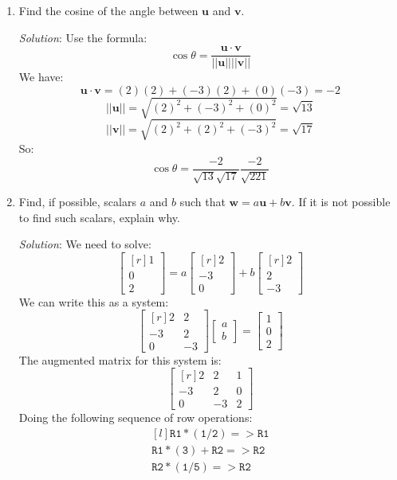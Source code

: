 \documentclass[12pt]{article}
\begin{document}
\begin{enumerate}
\item Find the cosine of the angle between $\mathbf{u}$ and $\mathbf{v}$.

\emph{Solution}: Use the formula:
\[
\cos\theta = \frac{\mathbf{u}\cdot\mathbf{v}}{||\mathbf{u}||||\mathbf{v}||}
\]
We have:
\[
\mathbf{u}\cdot\mathbf{v}=(2)(2)+(-3)(2)+(0)(-3)=-2
\]
\[
||\mathbf{u}||=\sqrt{(2)^2+(-3)^2+(0)^2}=\sqrt{13}
\]
\[
||\mathbf{v}||=\sqrt{(2)^2+(2)^2+(-3)^2}=\sqrt{17}
\]
So:
\[
\cos\theta =\frac{-2}{\sqrt{13}\sqrt{17}}\frac{-2}{\sqrt{221}}
\]
\proofend

\item Find, if possible, scalars $a$ and $b$ such that $\mathbf{w}=a\mathbf{u}+b\mathbf{v}$. If it is not possible to find such scalars, explain why.

\emph{Solution}:
We need to solve:
\[
\begin{bmatrix*}[r] 1\\ 0\\  2\end{bmatrix*}=
a\begin{bmatrix*}[r] 2\\ -3\\ 0\end{bmatrix*}+
b\begin{bmatrix*}[r] 2\\ 2\\ -3\end{bmatrix*}
\]
We can write this as a system:
\[
\begin{bmatrix*}[r] 2&2\\-3&2\\0&-3\end{bmatrix*}
\begin{bmatrix}a\\b\end{bmatrix}=
\begin{bmatrix*}1\\0\\2\end{bmatrix*}
\]
The augmented matrix for this system is:
\[
\left[\begin{matrix*}[r]2 & 2 & 1\\-3 & 2 & 0\\0 & -3 & 2\end{matrix*}\right]
\]
Doing the following sequence of row operations:
\[
\begin{matrix*}[l]
\mathtt{R1*(1/2)=>R1}\\
\mathtt{R1*(3)+R2=>R2}\\
\mathtt{R2*(1/5)=>R2}\\

\end{matrix*}\]
\end{enumerate}
\end{document}
